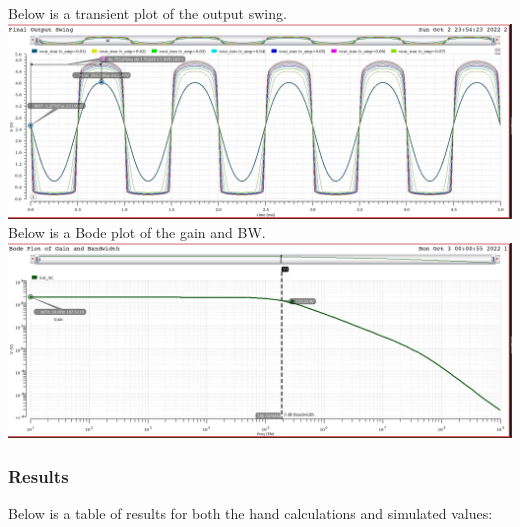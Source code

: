 \documentclass[12pt, fleqn]{article}
\begin{document}
\newpage
Below is a transient plot of the output swing.\\[0.1cm]
\includegraphics[scale=0.35, center]{c_swing.png}\\[0.25cm]
Below is a Bode plot of the gain and BW.\\[0.1cm]
\includegraphics[scale=0.35, center]{c_bode.png}
\newpage
\subsubsection{Results}
Below is a table of results for both the hand calculations and simulated values:
\end{document}
